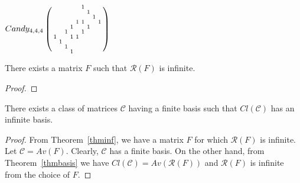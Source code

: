 $Candy_{4,4,4}\left(\begin{smallmatrix}
  &   &   &   &   & 1 &   &   &   \\
  &   &   &   &   &   & 1 &   &   \\
  &   &   &   &   &   &   & 1 &   \\
  &   &   &   & 1 & 1 &   &   & 1 \\
  &   &   & 1 &   &   & 1 &   &   \\
  &   & 1 &   &   & 1 &   &   &   \\
1 &   &   & 1 & 1 &   &   &   &   \\
  & 1 &   &   &   &   &   &   &   \\
  &   & 1 &   &   &   &   &   &   \\
  &   &   & 1 &   &   &   &   & 
\end{smallmatrix}\right)$
\begin{thm}
\label{thminf}
There exists a matrix $F$ such that $\mathcal{R}(F)$ is infinite.
\end{thm}
\begin{proof}
\end{proof}
\begin{cor}
There exists a class of matrices $\mathcal{C}$ having a finite basis such that $Cl(\mathcal{C})$ has an infinite basis.
\end{cor}
\begin{proof}
From Theorem~\ref{thminf}, we have a matrix $F$ for which $\mathcal{R}(F)$ is infinite. Let $\mathcal{C}=Av(F)$. Clearly, $\mathcal{C}$ has a finite basis. On the other hand, from Theorem~\ref{thmbasis} we have $Cl(\mathcal{C})=Av(\mathcal{R}(F))$ and $\mathcal{R}(F)$ is infinite from the choice of $F$.
\end{proof}